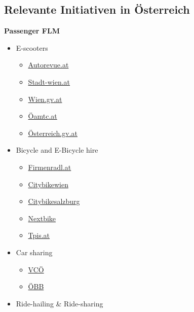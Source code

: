 \documentclass[
]{book}
\providecommand{\tightlist}{%
  \setlength{\itemsep}{0pt}\setlength{\parskip}{0pt}}
\begin{document}
\hypertarget{relevante-initiativen-in-uxf6sterreich-22}{%
\subsection*{Relevante Initiativen in Österreich}\label{relevante-initiativen-in-uxf6sterreich-22}}

\textbf{Passenger FLM}

\begin{itemize}
\tightlist
\item
  E-scooters

  \begin{itemize}
  \tightlist
  \item
    \href{https://autorevue.at/ratgeber/e-scooter-wien-vergleich}{Autorevue.at}
  \item
    \href{https://www.stadt-wien.at/wien/news/e-scooter-sharing-system-in-wien.html}{Stadt-wien.at}
  \item
    \href{https://www.wien.gv.at/verkehr/scooter-roller/index.html}{Wien.gv.at}
  \item
    \href{https://www.oeamtc.at/thema/fahrrad/e-kleintretroller-e-scooter-in-oesterreich-31721872}{Öamtc.at}
  \item
    \href{https://www.oesterreich.gv.at/themen/freizeit_und_strassenverkehr/Elektro-Scooter,-Quads-und-Co/Seite.610110.html}{Österreich.gv.at}
  \end{itemize}
\item
  Bicycle and E-Bicycle hire

  \begin{itemize}
  \tightlist
  \item
    \href{https://firmenradl.at/cms/}{Firmenradl.at}
  \item
    \href{https://www.citybikewien.at/de}{Citybikewien}
  \item
    \href{http://www.citybikesalzburg.at/}{Citybikesalzburg}
  \item
    \href{https://www.nextbike.at/de/niederoesterreich/}{Nextbike}
  \item
    \href{https://www.tips.at/nachrichten/linz/land-leute/523512-linzer-radverleih-startet-im-fruehjahr-an-40-standorten}{Tpis.at}
  \end{itemize}
\item
  Car sharing

  \begin{itemize}
  \tightlist
  \item
    \href{https://www.vcoe.at/presse/presseaussendungen/detail/carsharing-haushalte-potential-2018}{VCÖ}
  \item
    \href{https://www.carsharing-wien.com/anbieter/oebb-rail-and-drive}{ÖBB}
  \end{itemize}
\item
  Ride-hailing \& Ride-sharing


\end{itemize}
\end{document}
